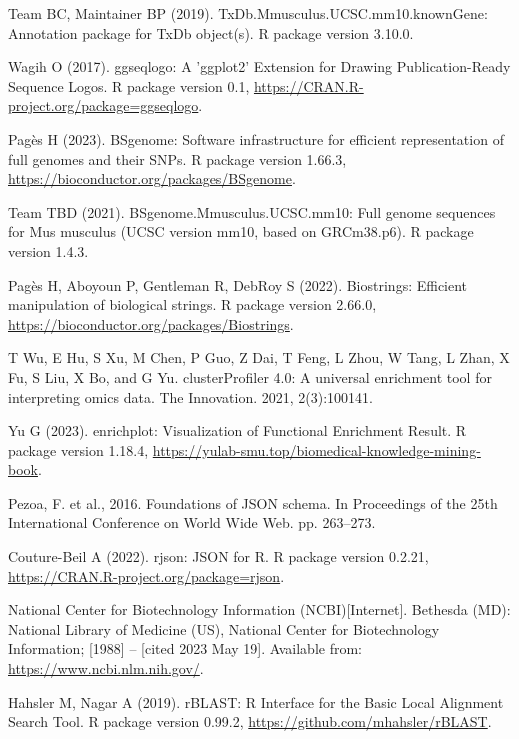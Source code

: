 \documentclass[12pt]{article}
\begin{document}
\begin{thebibliography}{99}
 Team BC, Maintainer BP (2019). 
TxDb.Mmusculus.UCSC.mm10.knownGene: Annotation package for TxDb object(s).
R package version 3.10.0.

 Wagih O (2017). ggseqlogo: A 'ggplot2' Extension for
Drawing Publication-Ready Sequence Logos. R package version 0.1, \newline
\url{https://CRAN.R-project.org/package=ggseqlogo}.

 Pagès H (2023). BSgenome: Software infrastructure for
efficient representation of full genomes and their SNPs. R package version
1.66.3, \newline
\url{https://bioconductor.org/packages/BSgenome}.

 Team TBD (2021). BSgenome.Mmusculus.UCSC.mm10: Full
genome sequences for Mus musculus (UCSC version mm10, based on GRCm38.p6). R
package version 1.4.3.

 Pagès H, Aboyoun P, Gentleman R, DebRoy S (2022).
Biostrings: Efficient manipulation of biological strings. R package version
2.66.0, \newline
\url{https://bioconductor.org/packages/Biostrings}.

 T Wu, E Hu, S Xu, M Chen, P Guo, Z Dai, T Feng,
L Zhou, W Tang, L Zhan, X Fu, S Liu, X Bo, and G Yu. clusterProfiler 4.0:
A universal enrichment tool for interpreting omics data. The Innovation. 2021,
2(3):100141.

 Yu G (2023). enrichplot: Visualization of Functional
Enrichment Result. R package version 1.18.4, \newline
\url{https://yulab-smu.top/biomedical-knowledge-mining-book}.

 Pezoa, F. et al., 2016. Foundations of JSON schema. In
Proceedings of the 25th International Conference on World Wide Web. pp. 263–273.

 Couture-Beil A (2022). rjson: JSON for R. R package version
0.2.21, \newline
\url{https://CRAN.R-project.org/package=rjson}.

 National Center for Biotechnology Information (NCBI)[Internet].
Bethesda (MD): National Library of Medicine (US), National Center for
Biotechnology Information; [1988] – [cited 2023 May 19]. Available from:
\url{https://www.ncbi.nlm.nih.gov/}.

 Hahsler M, Nagar A (2019). rBLAST: R Interface for the Basic
Local Alignment Search Tool. R package version 0.99.2, \newline
\url{https://github.com/mhahsler/rBLAST}.


\end{thebibliography}
\end{document}
